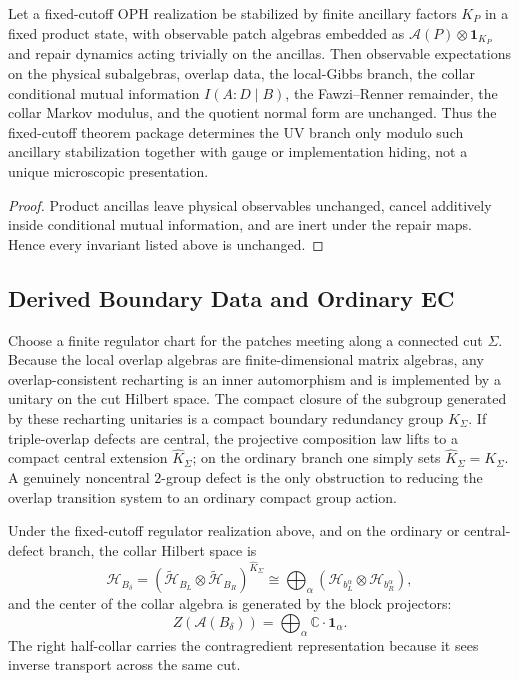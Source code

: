 \begin{proposition}
Let a fixed-cutoff OPH realization be stabilized by finite ancillary factors \(K_P\) in a fixed
product state, with observable patch algebras embedded as
\(\mathcal A(P)\otimes \mathbf 1_{K_P}\) and repair dynamics acting trivially on the ancillas.
Then observable expectations on the physical subalgebras, overlap data, the local-Gibbs branch,
the collar conditional mutual information \(I(A:D\mid B)\), the Fawzi--Renner remainder, the
collar Markov modulus, and the quotient normal form are unchanged. Thus the fixed-cutoff theorem
package determines the UV branch only modulo such ancillary stabilization together with gauge or
implementation hiding, not a unique microscopic presentation.
\end{proposition}

\begin{proof}
Product ancillas leave physical observables unchanged, cancel additively inside conditional mutual
information, and are inert under the repair maps. Hence every invariant listed above is unchanged.
\end{proof}

\subsection{Derived Boundary Data and Ordinary EC}

\begin{proposition}
Choose a finite regulator chart for the patches meeting along a connected cut \(\Sigma\). Because
the local overlap algebras are finite-dimensional matrix algebras, any overlap-consistent
recharting is an inner automorphism and is implemented by a unitary on the cut Hilbert space. The
compact closure of the subgroup generated by these recharting unitaries is a compact boundary
redundancy group \(K_\Sigma\). If triple-overlap defects are central, the projective composition
law lifts to a compact central extension \(\widehat K_\Sigma\); on the ordinary branch one simply
sets \(\widehat K_\Sigma = K_\Sigma\). A genuinely noncentral \(2\)-group defect is the only
obstruction to reducing the overlap transition system to an ordinary compact group action.
\end{proposition}

\begin{theorem}
Under the fixed-cutoff regulator realization above, and on the ordinary or central-defect branch,
the collar Hilbert space is
\[
\mathcal H_{B_\delta}
=
(\tilde{\mathcal H}_{B_L}\otimes \tilde{\mathcal H}_{B_R})^{\widehat K_\Sigma}
\cong
\bigoplus_{\alpha}
\left(\mathcal H_{b_L^\alpha}\otimes \mathcal H_{b_R^\alpha}\right),
\]
and the center of the collar algebra is generated by the block projectors:
\[
Z(\mathcal A(B_\delta))
=
\bigoplus_\alpha \mathbb C\cdot \mathbf 1_\alpha.
\]
The right half-collar carries the contragredient representation because it sees inverse transport
across the same cut.
\end{theorem}

